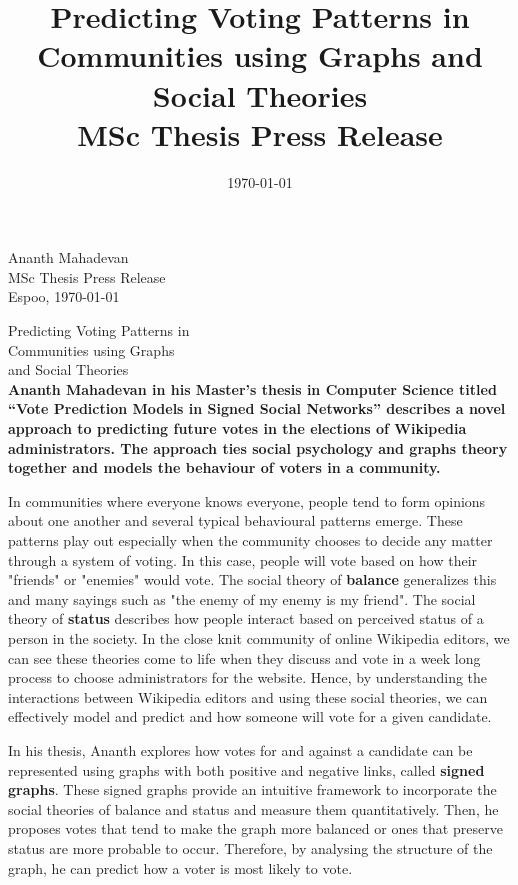 \documentclass[12pt,a4paper]{article}
\title{\color{astral}\myfont Predicting Voting Patterns in Communities using  Graphs and Social Theories\\
  \Large MSc Thesis Press Release}
\date{\today}
\author{\AUTHOR}
\newcommand{\AUTHOR}{Ananth Mahadevan}
\newcommand{\TTITLE}{Vote Prediction Models in Signed Social Networks}
\begin{document}
{\raggedleft \AUTHOR\\
\vskip 2mm
\noindent
MSc Thesis Press Release\\
\vskip 2mm
\noindent Espoo, \today
\vskip 10mm
}

{\centering \color{astral}\myfont Predicting Voting Patterns in \\Communities using  Graphs \\and Social Theories\\
}
\vskip 4mm
\noindent
{\bf
\large
Ananth Mahadevan in his Master’s thesis in Computer Science titled “\TTITLE” describes a novel approach to predicting future votes in the elections of Wikipedia administrators. The approach ties social psychology and graphs theory together and models the behaviour of voters in a community.
}

\medskip
\noindent
In communities where everyone knows everyone, people tend to form opinions about one another and several typical behavioural patterns emerge.
These patterns play out especially when the community chooses to decide any matter through a system of voting.
In this case, people will vote based on how their "friends" or "enemies" would vote.
The social theory of \textbf{balance} generalizes this and many sayings such as "the enemy of my enemy is my friend".
The social theory of \textbf{status} describes how people interact based on perceived status of a person in the society.
In the close knit community of online Wikipedia editors, we can see these theories come to life when they discuss and vote in a week long process to choose administrators for the website.
Hence, by understanding the interactions between Wikipedia editors and using these social theories, we can effectively model and predict and how someone will vote for a given candidate.

\medskip
\noindent
In his thesis, Ananth explores how votes for and against a candidate can be represented using graphs with both positive and negative links, called \textbf{signed graphs}.
These signed graphs provide an intuitive framework to incorporate the social theories of balance and status and measure them quantitatively.
Then, he proposes votes that tend to make the graph more balanced or ones that preserve status are more probable to occur.
Therefore, by analysing the structure of the graph, he can predict how a voter is most likely to vote. 
\end{document}

